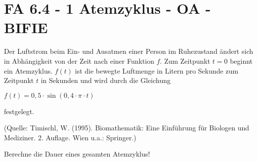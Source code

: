 \section{FA 6.4 - 1 Atemzyklus - OA - BIFIE}

\begin{beispiel}[FA 6.4]{1} %
				Der Luftstrom beim Ein- und Ausatmen einer Person im Ruhezustand ändert sich in Abhängigkeit von der Zeit nach einer Funktion $f$. Zum Zeitpunkt $t=0$ beginnt ein Atemzyklus. $f(t)$ ist die bewegte Luftmenge in Litern pro Sekunde zum Zeitpunkt $t$ in Sekunden und wird durch die Gleichung \begin{center}$f(t)=0,5\cdot\sin(0,4\cdot\pi\cdot t)$\end{center} festgelegt.

\begin{tiny} (Quelle: Timischl, W. (1995). Biomathematik: Eine Einführung für Biologen und Mediziner. 2. Auflage. Wien u.a.: Springer.)\end{tiny}

Berechne die Dauer eines gesamten Atemzyklus!

\end{beispiel}